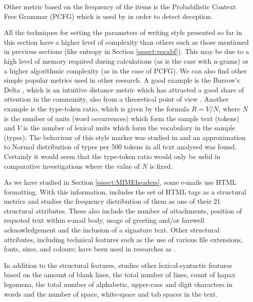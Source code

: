 Other metric based on the frequency of the items is the Probabilistic Context Free Grammar (PCFG) which is used by \cite{cfgstylo} in order to detect deception.

All the techniques for setting the parameters of writing style presented so far in this section have a higher level of complexity than others such as those mentioned in previous sections (like entropy in Section \ref{sssect:vocabf}). This may be due to a high level of memory required during calculations (as is the case with n-grams) or a higher algorithmic complexity (as in the case of PCFG). We can also find other simple popular metrics used in other research. A good example is the Burrow's Delta \citep{burrows2002delta}, which is an intuitive distance metric which has attracted a good share of attention in the community, also from a theoretical point of view \citep{argamon2008interpreting, hoover2004testing, hoover2004delta}. Another example is the type-token ratio, which is given by the formula $R=V/N$, where $N$ is the number of units (word occurrences) which form the sample text (tokens) and $V$ is the number of lexical units which form the vocabulary in the sample (types). The behaviour of this style marker was studied in \cite{kjetsaa1979and} and an approximation to Normal distribution of types per 500 tokens in all text analysed was found. Certainly it would seem that the type-token ratio would only be usful in comparative investigations where the value of $N$ is fixed.

As we have studied in Section \ref{sssect:MIMEheaders}, some e-mails use HTML formatting. With this information, \cite{de2001mining} includes the set of HTML tags as a structural metrics and studies the frequency distribution of them as one of their 21 structural attributes. These also include the number of attachments, position of requoted text within e-mail body, usage of greeting and/or farewell acknowledgement and the inclusion of a signature text. Other structural attributes, including technical features such as the use of various file extensions, fonts, sizes, and colours; have been used in researches as \cite{abbasi2005applying}.

In addition to the structural features, \cite{de2001mining} studies other lexical-syntactic features based on the amount of blank lines, the total number of lines, count of hapax legomena, the total number of alphabetic, upper-case and digit characters in words and the number of space, white-space and tab spaces in the text.


